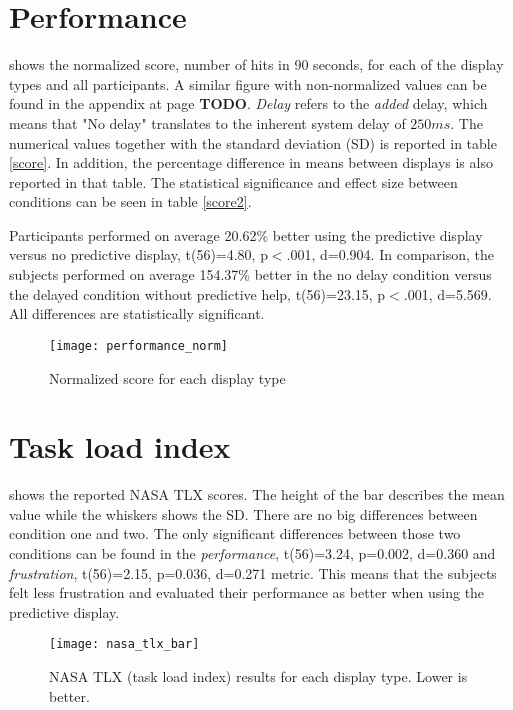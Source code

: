 \section{Performance}

 shows the normalized score, number of hits in 90 seconds, for each of the display types and all participants. A similar figure with non-normalized values can be found in the appendix at page \textbf{TODO}. \textit{Delay} refers to the \textit{added} delay, which means that "No delay" translates to the inherent system delay of $250 ms$. The numerical values together with the standard deviation (SD) is reported in table \ref{score}. In addition, the percentage difference in means between displays is also reported in that table. The statistical significance and effect size between conditions can be seen in table \ref{score2}.

Participants performed on average 20.62\% better using the predictive display versus no predictive display, t(56)=4.80, p$<$.001, d=0.904. In comparison, the subjects performed on average 154.37\% better in the no delay condition versus the delayed condition without predictive help, t(56)=23.15, p$<$.001, d=5.569. All differences are statistically significant.


\begin{figure}[h!]
    \centering
    \texttt{[image: performance\_norm]}
    \caption{Normalized score for each display type}
    \label{performanceNorm}
\end{figure}





\section{Task load index}

 shows the reported NASA TLX scores. The height of the bar describes the mean value while the whiskers shows the SD. There are no big differences between condition one and two. The only significant differences between those two conditions can be found in the \emph{performance}, t(56)=3.24, p=0.002, d=0.360 and \emph{frustration}, t(56)=2.15, p=0.036, d=0.271 metric. This means that the subjects felt less frustration and evaluated their performance as better when using the predictive display.


\begin{figure}[h!]
    \centering
    \texttt{[image: nasa\_tlx\_bar]}
    \caption{NASA TLX (task load index) results for each display type. Lower is better.}
    \label{tlx}
\end{figure}

